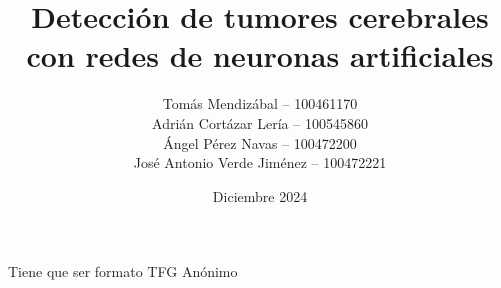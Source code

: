 \documentclass[es]{uc3mthesisIEEE}
\title{Detección de tumores cerebrales con redes de neuronas artificiales}
\author{Tomás Mendizábal -- 100461170 \\
        Adrián Cortázar Lería -- 100545860 \\
        Ángel Pérez Navas -- 100472200 \\
        José Antonio Verde Jiménez -- 100472221}
\date{Diciembre 2024}
\begin{document}
  \makecover


  \makeepigraph
    {Tiene que ser formato TFG}  %
    {Anónimo}  %
    {}  %

  \begin{abstract}
    \lipsum[1-3]
  \end{abstract}


  \tableofcontents
  \listoffigures
  \listoftables


  \begin{thesis}
  \end{thesis}


  \cleardoublepage
  \label{bibliography}
  \printbibliography[heading=bibintoc]


  \cleardoublepage
  \label{glossary}
  \printglossaries


\end{document}
